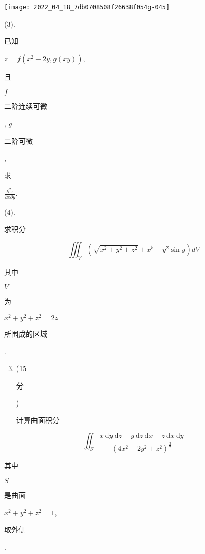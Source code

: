 \documentclass[10pt]{article}
\begin{document}
\texttt{[image: 2022\_04\_18\_7db0708508f26638f054g-045]}

(3). \begin{CJK}{UTF8}{mj}已知\end{CJK} $z=f\left(x^{2}-2 y, g(x y)\right)$, \begin{CJK}{UTF8}{mj}且\end{CJK} $f$ \begin{CJK}{UTF8}{mj}二阶连续可微\end{CJK}, $g$ \begin{CJK}{UTF8}{mj}二阶可微\end{CJK}, \begin{CJK}{UTF8}{mj}求\end{CJK} $\frac{\partial^{2} z}{\partial x \partial y}$.

(4). \begin{CJK}{UTF8}{mj}求积分\end{CJK}
$$
\iiint_{V}\left(\sqrt{x^{2}+y^{2}+z^{2}}+x^{5}+y^{2} \sin y\right) d V
$$
\begin{CJK}{UTF8}{mj}其中\end{CJK} $V$ \begin{CJK}{UTF8}{mj}为\end{CJK} $x^{2}+y^{2}+z^{2}=2 z$ \begin{CJK}{UTF8}{mj}所围成的区域\end{CJK}.

\begin{enumerate}
  \setcounter{enumi}{2}
  \item (15 \begin{CJK}{UTF8}{mj}分\end{CJK}) \begin{CJK}{UTF8}{mj}计算曲面积分\end{CJK}
\end{enumerate}
$$
\iint_{S} \frac{x \mathrm{~d} y \mathrm{~d} z+y \mathrm{~d} z \mathrm{~d} x+z \mathrm{~d} x \mathrm{~d} y}{\left(4 x^{2}+2 y^{2}+z^{2}\right)^{\frac{3}{2}}}
$$
\begin{CJK}{UTF8}{mj}其中\end{CJK} $S$ \begin{CJK}{UTF8}{mj}是曲面\end{CJK} $x^{2}+y^{2}+z^{2}=1$, \begin{CJK}{UTF8}{mj}取外侧\end{CJK}.
\end{document}
